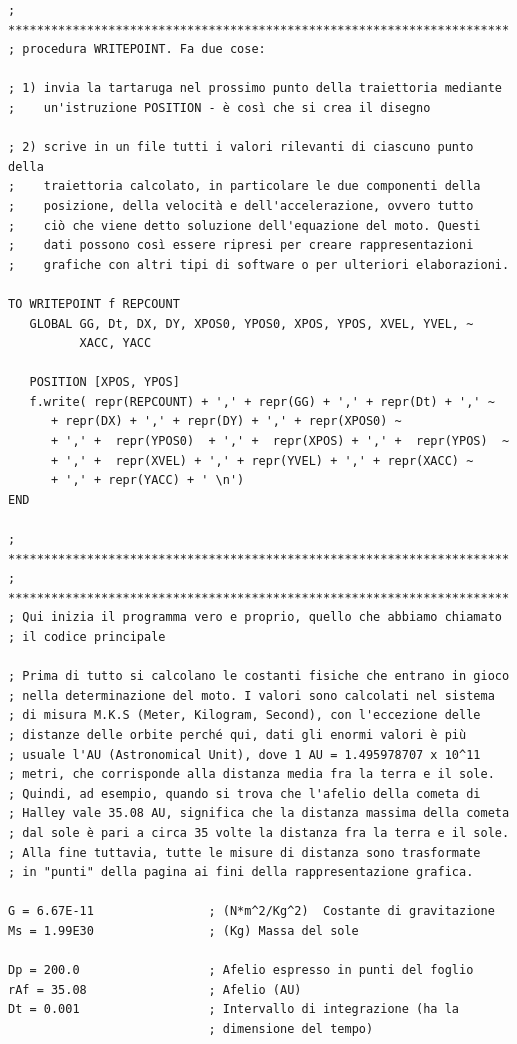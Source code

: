 \begin{lstlisting}[frame=single]
; **********************************************************************
; procedura WRITEPOINT. Fa due cose: 

; 1) invia la tartaruga nel prossimo punto della traiettoria mediante
;    un'istruzione POSITION - è così che si crea il disegno 

; 2) scrive in un file tutti i valori rilevanti di ciascuno punto della
;    traiettoria calcolato, in particolare le due componenti della 
;    posizione, della velocità e dell'accelerazione, ovvero tutto 
;    ciò che viene detto soluzione dell'equazione del moto. Questi 
;    dati possono così essere ripresi per creare rappresentazioni 
;    grafiche con altri tipi di software o per ulteriori elaborazioni.

TO WRITEPOINT f REPCOUNT
   GLOBAL GG, Dt, DX, DY, XPOS0, YPOS0, XPOS, YPOS, XVEL, YVEL, ~
          XACC, YACC 

   POSITION [XPOS, YPOS]
   f.write( repr(REPCOUNT) + ',' + repr(GG) + ',' + repr(Dt) + ',' ~
      + repr(DX) + ',' + repr(DY) + ',' + repr(XPOS0) ~
      + ',' +  repr(YPOS0)  + ',' +  repr(XPOS) + ',' +  repr(YPOS)  ~
      + ',' +  repr(XVEL) + ',' + repr(YVEL) + ',' + repr(XACC) ~
      + ',' + repr(YACC) + ' \n')
END

; **********************************************************************
; **********************************************************************
; Qui inizia il programma vero e proprio, quello che abbiamo chiamato
; il codice principale

; Prima di tutto si calcolano le costanti fisiche che entrano in gioco 
; nella determinazione del moto. I valori sono calcolati nel sistema 
; di misura M.K.S (Meter, Kilogram, Second), con l'eccezione delle 
; distanze delle orbite perché qui, dati gli enormi valori è più 
; usuale l'AU (Astronomical Unit), dove 1 AU = 1.495978707 x 10^11 
; metri, che corrisponde alla distanza media fra la terra e il sole. 
; Quindi, ad esempio, quando si trova che l'afelio della cometa di 
; Halley vale 35.08 AU, significa che la distanza massima della cometa 
; dal sole è pari a circa 35 volte la distanza fra la terra e il sole. 
; Alla fine tuttavia, tutte le misure di distanza sono trasformate 
; in "punti" della pagina ai fini della rappresentazione grafica.
 
G = 6.67E-11                ; (N*m^2/Kg^2)  Costante di gravitazione
Ms = 1.99E30                ; (Kg) Massa del sole

Dp = 200.0                  ; Afelio espresso in punti del foglio
rAf = 35.08                 ; Afelio (AU) 
Dt = 0.001                  ; Intervallo di integrazione (ha la 
                            ; dimensione del tempo)


\end{lstlisting}

